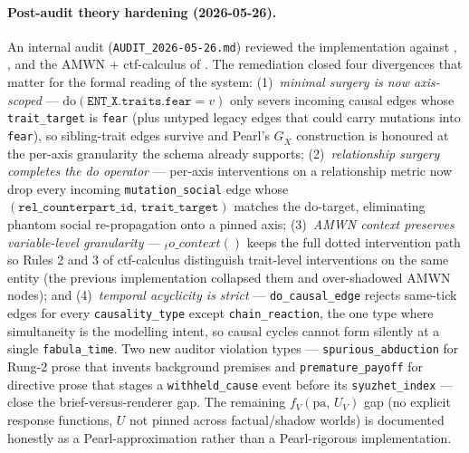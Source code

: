 \documentclass[11pt]{article}
\begin{document}
\paragraph{Post-audit theory hardening (2026-05-26).} An internal
audit (\texttt{AUDIT\_2026-05-26.md}) reviewed the implementation
against \citet{pearl2009causality},
\citet{bareinboim2022pearl}, and the AMWN \(+\)
ctf-calculus of \citet{correa2025amwn}. The remediation closed
four divergences that matter for the formal reading of the system:
(1)~\emph{minimal surgery is now axis-scoped} ---
\(\mathrm{do}(\texttt{ENT\_X.traits.fear}=v)\) only severs incoming
causal edges whose \texttt{trait\_target} is \texttt{fear} (plus
untyped legacy edges that could carry mutations into \texttt{fear}),
so sibling-trait edges survive and Pearl's \(G_{\overline X}\)
construction is honoured at the per-axis granularity the schema
already supports; (2)~\emph{relationship surgery completes the do
operator} --- per-axis interventions on a relationship metric now
drop every incoming \texttt{mutation\_social} edge whose
\((\texttt{rel\_counterpart\_id},\, \texttt{trait\_target})\) matches
the do-target, eliminating phantom social re-propagation onto a
pinned axis; (3)~\emph{AMWN context preserves variable-level
granularity} --- \(_to\_context()\) keeps the full dotted
intervention path so Rules 2 and 3 of ctf-calculus distinguish
trait-level interventions on the same entity (the previous
implementation collapsed them and over-shadowed AMWN nodes); and
(4)~\emph{temporal acyclicity is strict} ---
\texttt{do\_causal\_edge} rejects same-tick edges for every
\texttt{causality\_type} except \texttt{chain\_reaction}, the one
type where simultaneity is the modelling intent, so causal cycles
cannot form silently at a single \texttt{fabula\_time}. Two new
auditor violation types --- \texttt{spurious\_abduction} for
Rung-2 prose that invents background premises and
\texttt{premature\_payoff} for directive prose that stages a
\texttt{withheld\_cause} event before its \texttt{syuzhet\_index}
--- close the brief-versus-renderer gap. The remaining
\(f_V(\mathrm{pa},\, U_V)\) gap (no explicit response functions,
\(U\) not pinned across factual/shadow worlds) is documented
honestly as a Pearl-approximation rather than a Pearl-rigorous
implementation.
\end{document}
